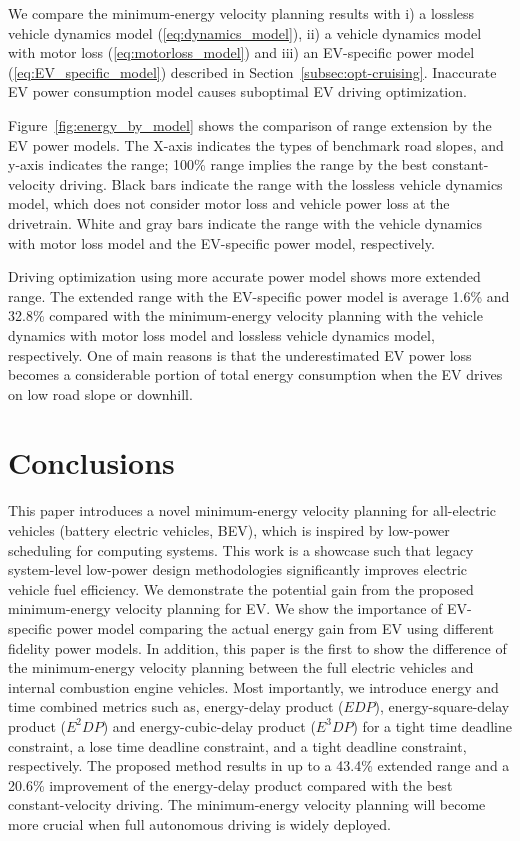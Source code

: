 \documentclass{IEEEtran}
\begin{document}
We compare the minimum-energy velocity planning results with i) a lossless vehicle dynamics model (\ref{eq:dynamics_model}), ii) a vehicle dynamics model with motor loss (\ref{eq:motorloss_model}) and iii) an EV-specific power model (\ref{eq:EV_specific_model}) described in Section~\ref{subsec:opt-cruising}. Inaccurate EV power consumption model causes suboptimal EV driving optimization.

Figure~\ref{fig:energy_by_model} shows the comparison of range extension by the EV power models. The X-axis indicates the types of benchmark road slopes, and y-axis indicates the range; 100\%  range implies the range by the best constant-velocity driving. Black bars indicate the range with the lossless vehicle dynamics model, which does not consider motor loss and vehicle power loss at the drivetrain. White and gray bars indicate the range with the vehicle dynamics with motor loss model and the EV-specific power model, respectively.

Driving optimization using more accurate power model shows more extended range. The extended range with the EV-specific power model is average 1.6\% and 32.8\% compared with the minimum-energy velocity planning with the vehicle dynamics with motor loss model and lossless vehicle dynamics model, respectively. One of main reasons is that the underestimated EV power loss becomes a considerable portion of total energy consumption when the EV drives on low road slope or downhill.

\section{Conclusions} \label{sec:conclusions}

This paper introduces a novel minimum-energy velocity planning for all-electric vehicles (battery electric vehicles, BEV), which is inspired by low-power scheduling for computing systems. This work is a showcase such that legacy system-level  low-power design methodologies significantly improves electric vehicle fuel efficiency. We demonstrate the potential gain from the proposed minimum-energy velocity planning for EV. We show the importance of EV-specific power model  comparing the actual energy gain from EV using different fidelity power models. In addition, this paper is the first to show the difference of the minimum-energy velocity planning between the full electric vehicles and internal combustion engine vehicles. Most importantly, we introduce energy and time combined metrics such as, energy-delay product ($EDP$), energy-square-delay product ($E^2DP$) and energy-cubic-delay product ($E^3DP$) for a tight time deadline constraint, a lose time deadline constraint, and a tight deadline constraint, respectively. 
The proposed method results in up to a 43.4\% extended range and a  20.6\% improvement of the energy-delay product compared with the best constant-velocity driving. 
The minimum-energy velocity planning will become more crucial when full autonomous driving is widely deployed.
\end{document}
